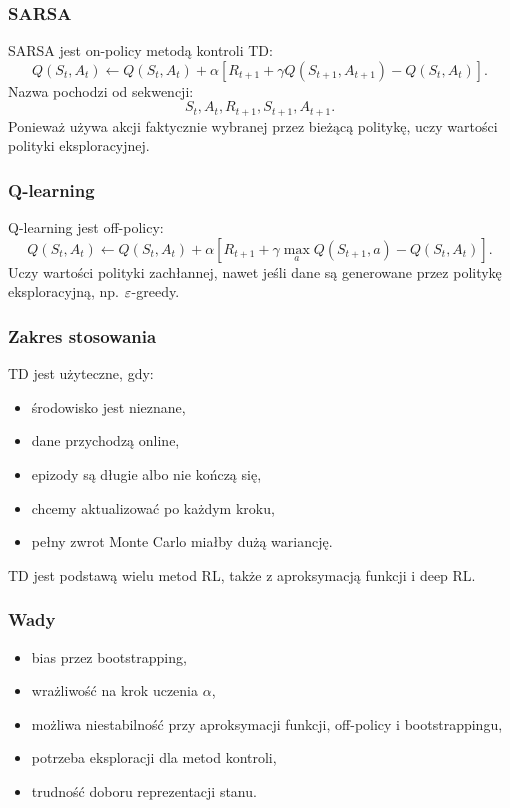 \subsubsection{SARSA}

SARSA jest on-policy metodą kontroli TD:
\[
Q(S_t,A_t)\leftarrow Q(S_t,A_t)+\alpha\left[R_{t+1}+\gamma Q(S_{t+1},A_{t+1})-Q(S_t,A_t)\right].
\]
Nazwa pochodzi od sekwencji:
\[
S_t,A_t,R_{t+1},S_{t+1},A_{t+1}.
\]
Ponieważ używa akcji faktycznie wybranej przez bieżącą politykę, uczy wartości polityki eksploracyjnej.

\subsubsection{Q-learning}

Q-learning jest off-policy:
\[
Q(S_t,A_t)\leftarrow Q(S_t,A_t)+\alpha\left[R_{t+1}+\gamma\max_a Q(S_{t+1},a)-Q(S_t,A_t)\right].
\]
Uczy wartości polityki zachłannej, nawet jeśli dane są generowane przez politykę eksploracyjną, np. $\varepsilon$-greedy.

\subsubsection{Zakres stosowania}

TD jest użyteczne, gdy:
\begin{itemize}
  \item środowisko jest nieznane,
  \item dane przychodzą online,
  \item epizody są długie albo nie kończą się,
  \item chcemy aktualizować po każdym kroku,
  \item pełny zwrot Monte Carlo miałby dużą wariancję.
\end{itemize}

TD jest podstawą wielu metod RL, także z aproksymacją funkcji i deep RL.

\subsubsection{Wady}

\begin{itemize}
  \item bias przez bootstrapping,
  \item wrażliwość na krok uczenia $\alpha$,
  \item możliwa niestabilność przy aproksymacji funkcji, off-policy i bootstrappingu,
  \item potrzeba eksploracji dla metod kontroli,
  \item trudność doboru reprezentacji stanu.
\end{itemize}

